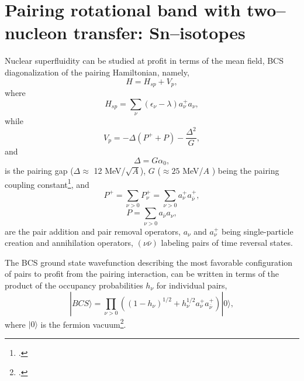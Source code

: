 \section[Pairing rotational bands]{Pairing rotational band with two--nucleon transfer: Sn--isotopes}\label{C8S2}

Nuclear superfluidity can be studied at profit in terms  of the mean field, BCS diagonalization
of the pairing Hamiltonian, namely,
\begin{equation}
H = H_{sp} + V_p,
\label{H}
\end{equation}
where
\begin{equation}
H_{sp} = \sum_{\nu} (\epsilon_{\nu} - \lambda) a^+_{\nu} a_{\nu},
\label{Hsp}
\end{equation}
while 
\begin{equation}
V_p = - \Delta (P^+ + P) - \frac{\Delta^2}{G},
\label{Vp}
\end{equation}
and
\begin{equation}
\Delta = G \alpha_0,
\label{delta}
\end{equation}
is the pairing gap ($\Delta \approx$ 12 MeV/$\sqrt{A}$), $G$ ($\approx 25$ MeV/$A$ ) being the pairing coupling constant\footnote{\cite{Bohr:75}.},
and 
\begin{equation}
P^+ = \sum_{\nu>0} P^+_{\nu}= \sum_{\nu>0} a^+_{\nu}a^+_{\bar \nu},
\label{P+}
\end{equation}
\begin{equation}
P = \sum_{\nu >0} a_{\bar \nu} a_{\nu},
\label{P-}
\end{equation}
are the pair addition and pair removal  operators, $a_{\nu}$ and $a^+_{\nu}$  being single-particle  creation  and annihilation  operators,
$(\nu \bar \nu)$ labeling pairs of time reversal states.

The BCS ground state wavefunction describing the most favorable configuration  of pairs to profit from the pairing interaction, can be 
written in terms  of the product of the occupancy probabilities $h_{\nu}$ for individual pairs,
\begin{equation}
|BCS\rangle = \prod_{\nu>0} ( (1 - h_{\nu})^{1/2} + h_{\nu}^{1/2} a^+_{\nu}a^+_{\bar \nu}) |0\rangle,
\end{equation}
where $|0\rangle$ is the fermion vacuum\footnote{\cite{Schrieffer:64,Schrieffer:73}.}.

